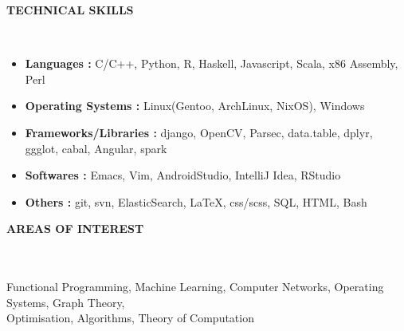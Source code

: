 \documentclass[a4paper,9pt]{extarticle}
\newcommand{\lsep}{-0.5cm}
\newcommand{\resheading}[1]{{\small \colorbox{mygrey}{\begin{minipage}{0.975\textwidth}{\textbf{#1 \vphantom{p\^{E}}}}\end{minipage}}}}
\begin{document}
        \resheading{\textbf{TECHNICAL SKILLS} }\\[\lsep]
        \vspace{1mm}
        \begin{itemize} \itemsep -3pt
        \item \noindent \textbf{Languages :} C/C++, Python, R, Haskell,
          Javascript, Scala, x86 Assembly, Perl
        \item \noindent \textbf{Operating Systems :} Linux(Gentoo, ArchLinux,
          NixOS), Windows
        \item\textbf{Frameworks/Libraries :} django, OpenCV, Parsec,
          data.table, dplyr, ggglot, cabal, Angular, spark
        \item\textbf{Softwares :} Emacs, Vim, AndroidStudio, IntelliJ Idea,
          RStudio
        \item\textbf{Others :} git, svn, ElasticSearch, \LaTeX, css/scss, SQL, HTML, Bash
        \end{itemize}

        \resheading{\textbf{AREAS OF INTEREST} }\\[\lsep]
        \vspace{3mm}\\
        \indent Functional Programming, Machine Learning, Computer Networks, Operating
        Systems, Graph Theory, \\
        \indent Optimisation, Algorithms, Theory of Computation
        \vspace{1mm}
        
\end{document}
